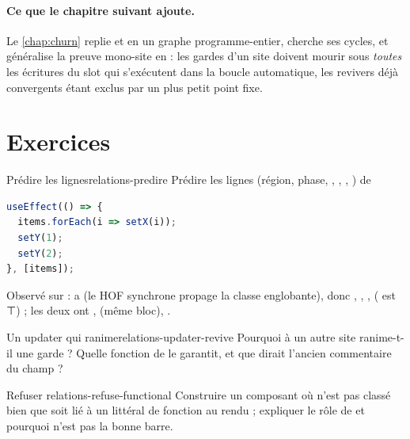\begin{resume}
\paragraph{Ce que le chapitre suivant ajoute.} Le \cref{chap:churn} replie  et  en un graphe programme-entier, cherche ses cycles, et généralise la preuve mono-site en  : les gardes d'un site doivent mourir sous \emph{toutes} les écritures du slot qui s'exécutent dans la boucle automatique, les revivers déjà convergents étant exclus par un plus petit point fixe.
\end{resume}

\section*{Exercices}
\begin{exercice}{Prédire les lignes}{relations-predire}
Prédire les lignes  (région, phase, , , , ) de
\begin{lstlisting}[language=TypeScript]
useEffect(() => {
  items.forEach(i => setX(i));
  setY(1);
  setY(2);
}, [items]);
\end{lstlisting}
\end{exercice}
\begin{solution}
Observé sur  :  a  (le HOF synchrone propage la classe englobante),  donc , , ,  ( est ⊤) ; les deux  ont ,  (même bloc), .
\end{solution}

\begin{exercice}{Un updater qui ranime}{relations-updater-revive}
Pourquoi  à un autre site ranime-t-il une garde  ? Quelle fonction de  le garantit, et que dirait l'ancien commentaire du champ  ?
\end{exercice}

\begin{exercice}{Refuser }{relations-refuse-functional}
Construire un composant où  n'est pas classé  bien que  soit lié à un littéral de fonction au rendu ; expliquer le rôle de  et pourquoi  n'est pas la bonne barre.
\end{exercice}

